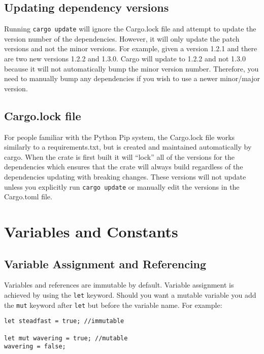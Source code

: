 \documentclass[12pt,notitlepage]{article}
\begin{document}
\subsection{Updating dependency versions}

Running \lstinline{cargo update} will ignore the Cargo.lock file and attempt to
update the version number of the dependencies. However, it will only update the
patch versions and not the minor versions. For example, given a version 1.2.1
and there are two new versions 1.2.2 and 1.3.0. Cargo will update to 1.2.2 and
not 1.3.0 because it will not automatically bump the minor version number.
Therefore, you need to manually bump any dependencies if you wish to use a
newer minor/major version.

\subsection{Cargo.lock file}

For people familiar with the Python Pip system, the Cargo.lock file works
similarly to a requirements.txt, but is created and maintained automatically by
cargo. When the crate is first built it will ``lock'' all of the versions for
the dependencies which ensures that the crate will always build regardless of
the dependencies updating with breaking changes. These versions will not update
unless you explicitly run \lstinline{cargo update} or manually edit the
versions in the Cargo.toml file.


\section{Variables and Constants}

\subsection{Variable Assignment and Referencing}

Variables and references are immutable by default. Variable assignment is
achieved by using the \lstinline{let} keyword. Should you want a mutable
variable you add the \lstinline{mut} keyword after \lstinline{let} but before
the variable name. For example:

\begin{lstlisting}
let steadfast = true; //immutable

let mut wavering = true; //mutable
wavering = false;

\end{lstlisting}
\end{document}
